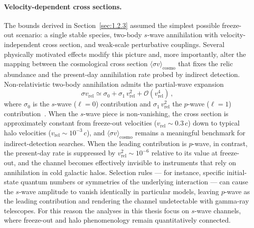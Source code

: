 \paragraph{Velocity-dependent cross sections.}
The bounds derived in Section~\ref{sec:1.2.3} assumed the simplest possible freeze-out scenario: a single stable species, two-body $s$-wave annihilation with velocity-independent cross section, and weak-scale perturbative couplings.
Several physically motivated effects modify this picture and, more importantly, alter the mapping between the cosmological cross section $\langle\sigma v\rangle_\mathrm{cosmo}$ that fixes the relic abundance and the present-day annihilation rate probed by indirect detection.
Non-relativistic two-body annihilation admits the partial-wave expansion
\begin{equation}
	\sigma v_\mathrm{rel} \simeq \sigma_0 + \sigma_1\, v_\mathrm{rel}^2 + \mathcal{O}(v_\mathrm{rel}^4)\,,
	\label{eq:partial_wave}
\end{equation}
where $\sigma_0$ is the $s$-wave ($\ell=0$) contribution and $\sigma_1\, v_\mathrm{rel}^2$ the $p$-wave ($\ell=1$) contribution~\cite{Cirelli:2024ssz}.
When the $s$-wave piece is non-vanishing, the cross section is approximately constant from freeze-out velocities ($v_\mathrm{rel}\sim 0.3\,c$) down to typical halo velocities ($v_\mathrm{rel}\sim 10^{-3}\,c$), and $\langle\sigma v\rangle_\mathrm{cosmo}$ remains a meaningful benchmark for indirect-detection searches.
When the leading contribution is $p$-wave, in contrast, the present-day rate is suppressed by $v_\mathrm{rel}^2 \sim 10^{-6}$ relative to its value at freeze-out, and the channel becomes effectively invisible to instruments that rely on annihilation in cold galactic halos.
Selection rules --- for instance, specific initial-state quantum numbers or symmetries of the underlying interaction --- can cause the $s$-wave amplitude to vanish identically in particular models, leaving $p$-wave as the leading contribution and rendering the channel undetectable with gamma-ray telescopes.
For this reason the analyses in this thesis focus on $s$-wave channels, where freeze-out and halo phenomenology remain quantitatively connected.

